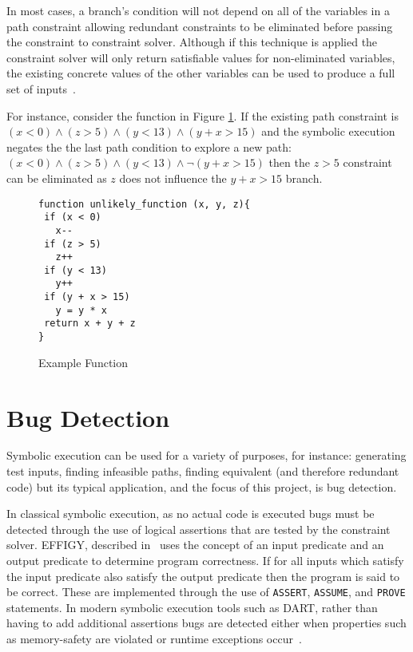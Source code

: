 \documentclass[]{final_report}
\begin{document}
In most cases, a branch's condition will not depend on all of the variables in a path constraint allowing redundant constraints to be eliminated before passing the constraint to constraint solver. Although if this technique is applied the constraint solver will only return satisfiable values for non-eliminated variables, the existing concrete values of the other variables can be used to produce a full set of inputs~\cite{cadar2013symbolic}.

For instance, consider the function in Figure \ref{fig:example-function}. If the existing path constraint is $(x < 0 ) \land ( z > 5) \land (y < 13) \land (y + x > 15) $ and the symbolic execution negates the the last path condition to explore a new path: $ (x < 0) \land (z > 5) \land (y < 13) \land \lnot(y + x > 15)$ then the $z > 5$ constraint can be eliminated as $z$ does not influence the $y + x > 15$ branch.

\begin{figure}[h]
\begin{verbatim}
function unlikely_function (x, y, z){
 if (x < 0)
   x--
 if (z > 5)
   z++
 if (y < 13)
   y++
 if (y + x > 15)
   y = y * x
 return x + y + z
}
\end{verbatim}
\caption{\label{fig:example-function} Example Function}
\end{figure} 

\section{Bug Detection}

Symbolic execution can be used for a variety of purposes, for instance: generating test inputs, finding infeasible paths, finding equivalent (and therefore redundant code) but its typical application, and the focus of this project, is bug detection. 

In classical symbolic execution, as no actual code is executed bugs must be detected through the use of logical assertions that are tested by the constraint solver. EFFIGY, described in~\cite{king1976symbolic} uses the concept of an input predicate and an output predicate to determine program correctness. If for all inputs which satisfy the input predicate also satisfy the output predicate then the program is said to be correct. These are implemented through the use of \lstinline{ASSERT}, \lstinline{ASSUME}, and \lstinline{PROVE} statements. In modern symbolic execution tools such as DART, rather than having to add additional assertions bugs are detected either when properties such as memory-safety are violated or runtime exceptions occur~\cite{godefroid2005dart}.
\end{document}

